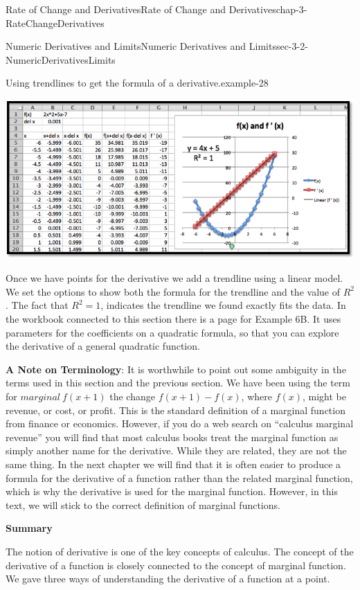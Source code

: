 \documentclass[oneside,10pt,]{book}
\newcommand{\terminology}[1]{\textbf{#1}}
\numberwithin{equation}{section}
\begin{document}
\begin{chapterptx}{Rate of Change and Derivatives}{}{Rate of Change and Derivatives}{}{}{chap-3-RateChangeDerivatives}
\begin{sectionptx}{Numeric Derivatives and Limits}{}{Numeric Derivatives and Limits}{}{}{sec-3-2-NumericDerivativesLimits}
\begin{example}{Using trendlines to get the formula of a derivative.}{example-28}
\begin{sidebyside}{1}{0}{0}{0}
\begin{sbspanel}{1}
\includegraphics[width=1\linewidth]{images/sec3-2-10.png}
\end{sbspanel}%
\end{sidebyside}%
\par
\hypertarget{p-1047}{}%
Once we have points for the derivative we add a trendline using a linear model.  We set the options to show both the formula for the trendline and the value of \(R^2\).  The fact that \(R^2=1\), indicates the trendline we found exactly fits the data.  In the workbook connected to this section there is a page for Example 6B.  It uses parameters for the coefficients on a quadratic formula, so that you can explore the derivative of a general quadratic function.%
\end{example}
\hypertarget{p-1048}{}%
\terminology{A Note on Terminology}:  It is worthwhile to point out some ambiguity in the terms used in this section and the previous section.  We have been using the term for \(marginal\ f(x+1)\) the change \(f(x+1)-f(x)\), where \(f(x)\), might be revenue, or cost, or profit.  This is the standard definition of a marginal function from finance or economics.  However, if you do a web search on ``calculus marginal revenue'' you will find that most calculus books treat the marginal function as simply another name for the derivative.  While they are related, they are not the same thing.  In the next chapter we will find that it is often easier to produce a formula for the derivative of a function rather than the related marginal function, which is why the derivative is used for the marginal function.  However, in this text, we will stick to the correct definition of marginal functions.%
\par
\hypertarget{p-1049}{}%
\terminology{Summary}%
\par
\hypertarget{p-1050}{}%
The notion of derivative is one of the key concepts of calculus.  The concept of the derivative of a function is closely connected to the concept of marginal function.  We gave three ways of understanding the derivative of a function at a point.%

\end{sectionptx}
\end{chapterptx}
\end{document}
